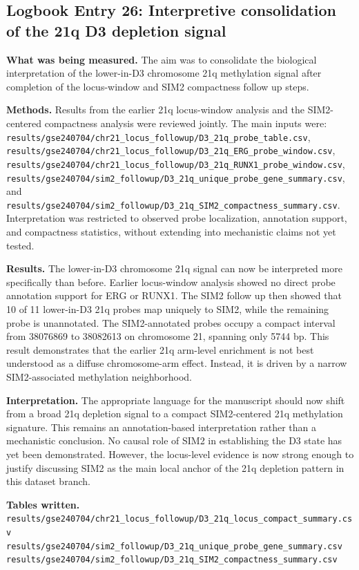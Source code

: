 \subsection*{Logbook Entry 26: Interpretive consolidation of the 21q D3 depletion signal}

\textbf{What was being measured.}
The aim was to consolidate the biological interpretation of the lower-in-D3 chromosome 21q methylation signal after completion of the locus-window and SIM2 compactness follow up steps.

\textbf{Methods.}
Results from the earlier 21q locus-window analysis and the SIM2-centered compactness analysis were reviewed jointly. The main inputs were:
\texttt{results/gse240704/chr21\_locus\_followup/D3\_21q\_probe\_table.csv},
\texttt{results/gse240704/chr21\_locus\_followup/D3\_21q\_ERG\_probe\_window.csv},
\texttt{results/gse240704/chr21\_locus\_followup/D3\_21q\_RUNX1\_probe\_window.csv},
\texttt{results/gse240704/sim2\_followup/D3\_21q\_unique\_probe\_gene\_summary.csv}, and
\texttt{results/gse240704/sim2\_followup/D3\_21q\_SIM2\_compactness\_summary.csv}.
Interpretation was restricted to observed probe localization, annotation support, and compactness statistics, without extending into mechanistic claims not yet tested.

\textbf{Results.}
The lower-in-D3 chromosome 21q signal can now be interpreted more specifically than before. Earlier locus-window analysis showed no direct probe annotation support for ERG or RUNX1. The SIM2 follow up then showed that 10 of 11 lower-in-D3 21q probes map uniquely to SIM2, while the remaining probe is unannotated. The SIM2-annotated probes occupy a compact interval from 38076869 to 38082613 on chromosome 21, spanning only 5744 bp. This result demonstrates that the earlier 21q arm-level enrichment is not best understood as a diffuse chromosome-arm effect. Instead, it is driven by a narrow SIM2-associated methylation neighborhood.

\textbf{Interpretation.}
The appropriate language for the manuscript should now shift from a broad 21q depletion signal to a compact SIM2-centered 21q methylation signature. This remains an annotation-based interpretation rather than a mechanistic conclusion. No causal role of SIM2 in establishing the D3 state has yet been demonstrated. However, the locus-level evidence is now strong enough to justify discussing SIM2 as the main local anchor of the 21q depletion pattern in this dataset branch.

\textbf{Tables written.}
\texttt{results/gse240704/chr21\_locus\_followup/D3\_21q\_locus\_compact\_summary.csv}\\
\texttt{results/gse240704/sim2\_followup/D3\_21q\_unique\_probe\_gene\_summary.csv}\\
\texttt{results/gse240704/sim2\_followup/D3\_21q\_SIM2\_compactness\_summary.csv}

